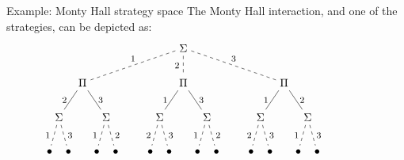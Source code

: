 \documentclass[aspectratio=1610,mathserif]{beamer}
\begin{document}
\begin{frame}[fragile]{Example: Monty Hall strategy space} %
  The Monty Hall interaction, and one of the strategies, can be depicted as:
  \[
    \begin{tikzpicture}
      [baseline=(B.base),
       level distance=11mm,
       level 1/.style={sibling distance=3.2cm,edge from parent/.style={draw,dashed}},
       level 2/.style={sibling distance=1.5cm,edge from parent/.style={draw,solid}},
       level 3/.style={sibling distance=0.6cm,edge from parent/.style={draw,dashed}},
       every node/.style={font=\footnotesize},
       every child node/.style={font=\normalsize}]
      \node[font=\normalsize] {$\Sigma$}
        child {
          node {$\Pi$}
          child {
            node {$\Sigma$}
            child { node {$\bullet$} edge from parent node[left] {$1$} }
            child { node {$\bullet$} edge from parent node[right] {$3$} }
            edge from parent node[left] (B) {$2$}
          }
          child {
            node {$\Sigma$}
            child { node {$\bullet$} edge from parent node[left] {$1$} }
            child { node {$\bullet$} edge from parent node[right] {$2$} }
            edge from parent node[right] {$3$}
          }
          edge from parent node[above] {$1$}
        }
        child {
          node {$\Pi$}
          child {
            node {$\Sigma$}
            child { node {$\bullet$} edge from parent node[left] {$2$} }
            child { node {$\bullet$} edge from parent node[right] {$3$} }
            edge from parent node[left] {$1$}
          }
          child {
            node {$\Sigma$}
            child { node {$\bullet$} edge from parent node[left] {$1$} }
            child { node {$\bullet$} edge from parent node[right] {$2$} }
            edge from parent node[right] {$3$}
          }
          edge from parent node[left] {$2$}
        }
        child {
          node {$\Pi$}
          child {
            node {$\Sigma$}
            child { node {$\bullet$} edge from parent node[left] {$2$} }
            child { node {$\bullet$} edge from parent node[right] {$3$} }
            edge from parent node[left] {$1$}
          }
          child {
            node {$\Sigma$}
            child { node {$\bullet$} edge from parent node[left] {$1$} }
            child { node {$\bullet$} edge from parent node[right] {$3$} }
            edge from parent node[right] {$2$}
          }
          edge from parent node[above] {$3$}
        }
        ;
    \end{tikzpicture}
    \qquad
    \qquad
    \begin{tikzpicture}

\end{tikzpicture}\]
\end{frame}
\end{document}
